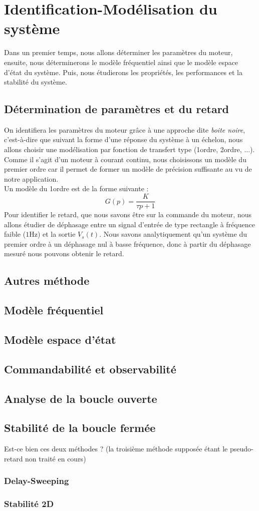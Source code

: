 \chapter{Identification-Modélisation du système}
Dans un premier temps, nous allons déterminer les paramètres du moteur, ensuite, nous déterminerons le modèle fréquentiel ainsi que le modèle espace d'état du système. Puis, nous étudierons les propriétés, les performances et la stabilité du système. 
	\section{Détermination de paramètres et du retard}
	On identifiera les paramètres du moteur grâce à une approche dite \emph{boite noire}, c'est-à-dire que suivant la forme d'une réponse du système à un échelon, nous allons choisir une modélisation par fonction de transfert type (1\ier ordre, 2\ieme ordre, ...). Comme il s'agit d'un moteur à courant continu, nous choisissons un modèle du premier ordre car il permet de former un modèle de précision suffisante au vu de notre application.\\
Un modèle du 1\ier ordre est de la forme suivante :
\begin{equation}
G(p) = \frac{K}{\tau p+1}
\end{equation}
Pour identifier le retard, que nous savons être sur la commande du moteur, nous allons étudier de déphasage entre un signal d'entrée de type rectangle à fréquence faible ($1$Hz) et la sortie $V_s(t)$. Nous savons analytiquement qu'un système du premier ordre à un déphasage nul à basse fréquence, donc à partir du déphasage mesuré nous pouvons obtenir le retard.

	\section{Autres méthode}
	\section{Modèle fréquentiel}
	\section{Modèle espace d'état}
	\section{Commandabilité et observabilité}
	\section{Analyse de la boucle ouverte}
	\section{Stabilité de la boucle fermée}
	Est-ce bien ces deux méthodes ? (la troisième méthode supposée étant le pseudo-retard non traité en cours)
		\subsection{Delay-Sweeping}
		\subsection{Stabilité 2D}


